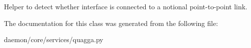 \begin{DoxyVerb}Helper to detect whether interface is connected to a notional
point-to-point link.
\end{DoxyVerb}
 

The documentation for this class was generated from the following file\+:\begin{DoxyCompactItemize}
\item 
daemon/core/services/quagga.\+py\end{DoxyCompactItemize}
